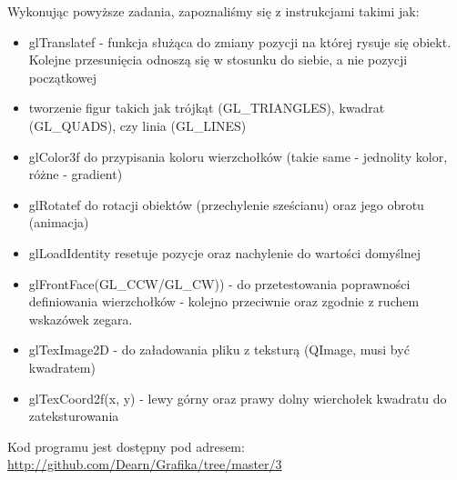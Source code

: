 \documentclass{article}
\begin{document}
Wykonując powyższe zadania, zapoznaliśmy się z instrukcjami takimi jak:
\begin{itemize}
\item \textsf{glTranslatef} - funkcja służąca do zmiany pozycji na której rysuje się obiekt. Kolejne przesunięcia odnoszą się w stosunku do siebie, a nie pozycji początkowej
\item tworzenie figur takich jak trójkąt (\textsf{GL\_TRIANGLES}), kwadrat (\textsf{GL\_QUADS}), czy linia (\textsf{GL\_LINES})
\item \textsf{glColor3f} do przypisania koloru wierzchołków (takie same - jednolity kolor, różne - gradient)
\item \textsf{glRotatef} do rotacji obiektów (przechylenie sześcianu) oraz jego obrotu (animacja)
\item \textsf{glLoadIdentity} resetuje pozycje oraz nachylenie do wartości domyślnej
\item \textsf{glFrontFace}(\textsf{GL\_CCW}/\textsf{GL\_CW)}) - do przetestowania poprawności definiowania wierzchołków - kolejno przeciwnie oraz zgodnie z ruchem wskazówek zegara.
\item \textsf{glTexImage2D} - do załadowania pliku z teksturą (\textsf{QImage}, musi być kwadratem)
\item \textsf{glTexCoord2f(x, y)} - lewy górny oraz prawy dolny wierchołek kwadratu do zateksturowania
\end{itemize}
\vfill
Kod programu jest dostępny pod adresem:\\ \url{http://github.com/Dearn/Grafika/tree/master/3}
\end{document}
